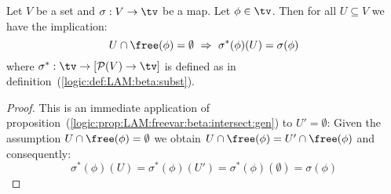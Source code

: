 \begin{prop}\label{logic:prop:LAM:freevar:beta:intersect}
    Let $V$ be a set and $\sigma:V\to\tv$ be a map. Let $\phi\in\tv$.
    Then for all $U\subseteq V$ we have the implication:
        \[
            U\cap\free(\phi) = \emptyset
            \ \Rightarrow\ 
            \sigma^{*}(\phi)(U) = \sigma(\phi)
        \]
    where $\sigma^{*}:\tv\to[{\cal P}(V)\to\tv]$ is defined as in 
    definition~(\ref{logic:def:LAM:beta:subst}).
\end{prop}
\begin{proof}
    This is an immediate application of 
    proposition~(\ref{logic:prop:LAM:freevar:beta:intersect:gen}) 
    to $U'=\emptyset$: Given the assumption $U\cap\free(\phi) = \emptyset$ 
    we obtain $U\cap\free(\phi)=U'\cap\free(\phi)$ and consequently:
        \[
            \sigma^{*}(\phi)(U)=\sigma^{*}(\phi)(U')
            =\sigma^{*}(\phi)(\emptyset)=\sigma(\phi)
        \]
\end{proof}

